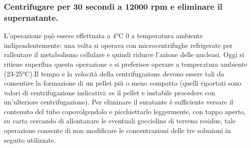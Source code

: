 \documentclass{extarticle}
\begin{document}
\subsubsection*{Centrifugare per 30 secondi a 12000 rpm e eliminare il supernatante.}L'operazione può essere effettuata a 4°C 0 a temperatura ambiente indipendentemente: una volta si operava con microcentrifughe refrigerate per rallentare il metabolismo cellulare e quindi ridurre l'azione delle nucleasi. Oggi si ritiene superflua questa operazione e si preferisce operare a temperatura ambiente (23-25°C).Il tempo e la velocità della centrifugazione devono essere tali da consentire la formazione di un pellet più o meno compatto (quelli riportati sono valori di centrifugazione indicativi: se il pellet e instabile procedere con un'ulteriore centrifugazione). Per eliminare il suratante è sufficiente versare il contenuto del tubo capovolgendolo e picchiettarlo leggermente, con tappo aperto, su carta cercando di allontanare le eventuali goccioline di terreno residue, tale operazione consente di non modificare le concentrazioni delle tre soluzioni in seguito utilizzate.
\end{document}
